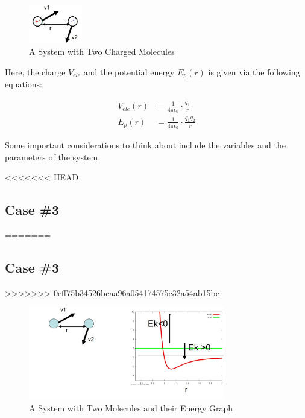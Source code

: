 \documentclass[
  letterpaper,
  DIV=11,
  numbers=noendperiod]{scrreprt}
\begin{document}
\begin{figure}

{\centering \includegraphics[width=0.92in,height=\textheight]{./images/wk1/sys2.jpg}

}

\caption{A System with Two Charged Molecules}

\end{figure}

Here, the charge \(V_{ele}\) and the potential energy \(E_p(r)\) is
given via the following equations:

\begin{align}
  V_{ele}(r) &= \frac{1}{4\pi \epsilon_0} \cdot \frac{q_1}{r} \\ 
  E_p(r) &= \frac{1}{4\pi \epsilon_0} \cdot \frac{q_1q_2}{r}
\end{align}

Some important considerations to think about include the variables and
the parameters of the system.

<<<<<<< HEAD
\hypertarget{case-3-1}{%
\subsection{Case \#3}\label{case-3-1}}
=======
\hypertarget{case-3}{%
\subsection{Case \#3}\label{case-3}}
>>>>>>> 0eff75b34526bcaa96a054174575c32a54ab15bc

\begin{figure}

{\centering \includegraphics[width=3.36in,height=\textheight]{./images/wk1/sys3.jpg}

}

\caption{A System with Two Molecules and their Energy Graph}

\end{figure}
\end{document}
